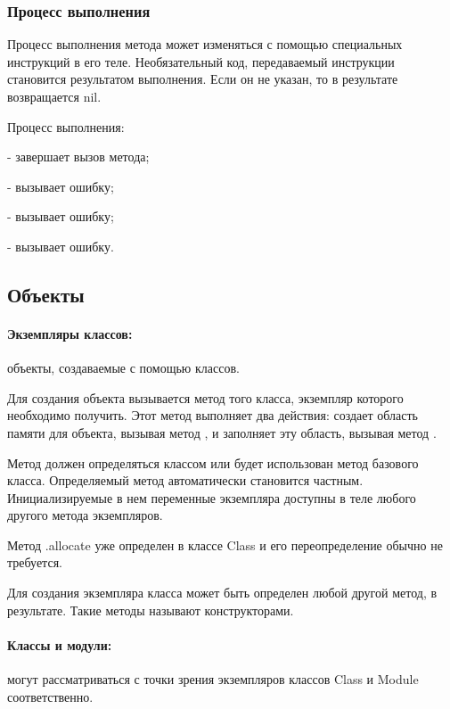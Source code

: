 \subsubsection*{Процесс выполнения}

Процесс выполнения метода может изменяться с помощью специальных инструкций в его теле. Необязательный код, передаваемый инструкции становится результатом выполнения. Если он не указан, то в результате возвращается nil.
\begin{keylist}{Процесс выполнения:}
  
   - завершает вызов метода;
  
   - вызывает ошибку;
  
   - вызывает ошибку;
  
   - вызывает ошибку.
\end{keylist}

\subsection{Объекты}

\paragraph*{Экземпляры классов:} объекты, создаваемые с помощью классов.

Для создания объекта вызывается метод  того класса, экземпляр которого необходимо получить. Этот метод выполняет два действия: создает область памяти для объекта, вызывая метод , и заполняет эту область, вызывая метод . 

Метод  должен определяться классом или будет использован метод базового класса. Определяемый метод автоматически становится частным. Инициализируемые в нем переменные экземпляра доступны в теле любого другого метода экземпляров.

\begin{note}
  Метод .allocate уже определен в классе Class и его переопределение обычно не требуется.
\end{note}

Для создания экземпляра класса может быть определен любой другой метод, в результате. Такие методы называют конструкторами.

\paragraph*{Классы и модули:} могут рассматриваться с точки зрения экземпляров классов Class и Module соответственно.

